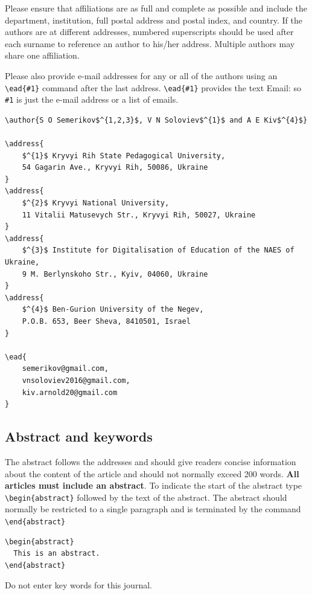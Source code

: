 \documentclass[a4paper]{jpconf}
\begin{document}
Please ensure that affiliations are as full and complete as possible and include the department, institution, full postal address and postal index, and country. 
If the authors are at different addresses, numbered superscripts should be used after each surname to reference an author to his/her address.
Multiple authors may share one affiliation. 

Please also provide e-mail addresses for any or all of the authors using an \verb"\ead{#1}" command after the last address. \verb"\ead{#1}" provides the text Email: so \verb"#1" is just the e-mail address or a list of emails.  

\begin{verbatim}
\author{S O Semerikov$^{1,2,3}$, V N Soloviev$^{1}$ and A E Kiv$^{4}$}

\address{
    $^{1}$ Kryvyi Rih State Pedagogical University, 
    54 Gagarin Ave., Kryvyi Rih, 50086, Ukraine
}
\address{
    $^{2}$ Kryvyi National University, 
    11 Vitalii Matusevych Str., Kryvyi Rih, 50027, Ukraine
}
\address{
    $^{3}$ Institute for Digitalisation of Education of the NAES of Ukraine, 
    9 M. Berlynskoho Str., Kyiv, 04060, Ukraine
}
\address{
    $^{4}$ Ben-Gurion University of the Negev, 
    P.O.B. 653, Beer Sheva, 8410501, Israel
}

\ead{
    semerikov@gmail.com,
    vnsoloviev2016@gmail.com,
    kiv.arnold20@gmail.com
}
\end{verbatim}

\subsection{Abstract and keywords}

The abstract follows the addresses and
should give readers concise information about the content 
of the article and should not normally exceed 200 
words. {\bf All articles must include an abstract}. To indicate the start 
of the abstract type \verb"\begin{abstract}" followed by the text of the 
abstract.  The abstract should normally be restricted 
to a single paragraph and is terminated by the command
\verb"\end{abstract}"

\begin{verbatim}
\begin{abstract}
  This is an abstract.
\end{abstract}
\end{verbatim}

Do not enter key words for this journal.
\end{document}

